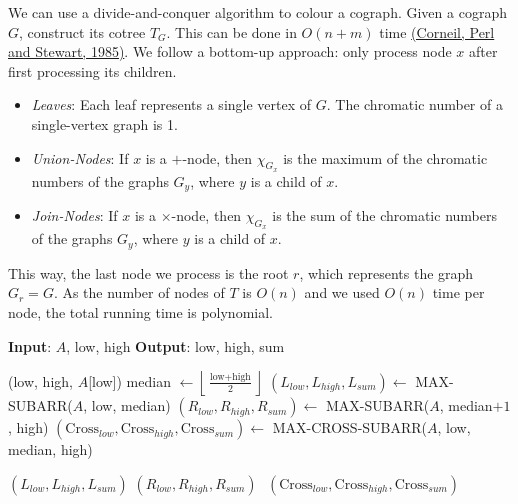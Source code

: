 We can use a divide-and-conquer algorithm to colour a cograph. 
Given a cograph \(G\), construct its cotree \(T_G\). 
This can be done in \(O(n+m)\) time \hyperref[cit:A Linear Recognition Algorithm for Cographs]{(Corneil, Perl and Stewart, 1985)}. 
We follow a bottom-up approach: only process node \(x\) after first processing its children.
\begin{itemize}
    \item \textit{Leaves}: Each leaf represents a single vertex of \(G\).
        The chromatic number of a single-vertex graph is 1.
    \item \textit{Union-Nodes}: If \(x\) is a \(+\)-node, then \(\chi_{G_x}\) is the maximum of the chromatic numbers of the graphs \(G_y\), where \(y\) is a child of \(x\).
    \item \textit{Join-Nodes}: If \(x\) is a \(\times\)-node, then \(\chi_{G_x}\) is the sum of the chromatic numbers of the graphs \(G_y\), where \(y\) is a child of \(x\).
\end{itemize}
This way, the last node we process is the root \(r\), which represents the graph \(G_r=G\).
As the number of nodes of \(T\) is \(O(n)\) and we used \(O(n)\) time per node, the total running time is polynomial.

\begin{algorithm}[H]
    \caption{MAX-SUBARR}
    \begin{algorithmic}
        \State \textbf{Input}: \(A\), low, high
        \State \textbf{Output}: low, high, sum
        
            \Return (low, high, \(A\)[low])
        \Else
            \State median \(\gets \left\lfloor \frac{\text{low} + \text{high}}{2} \right\rfloor\)
            \State \((L_{low}, L_{high}, L_{sum}) \gets\) MAX-SUBARR(\(A\), low, median) 
            \State \((R_{low}, R_{high}, R_{sum}) \gets\) MAX-SUBARR(\(A\), median\(+1\), high) 
            \State \((\text{Cross}_{low}, \text{Cross}_{high}, \text{Cross}_{sum}) \gets\) MAX-CROSS-SUBARR(\(A\), low, median, high) 

                \Return \((L_{low}, L_{high}, L_{sum})\)
            \EndIf
                \Return \((R_{low}, R_{high}, R_{sum})\)
            \Else \( \) \Return \((\text{Cross}_{low}, \text{Cross}_{high}, \text{Cross}_{sum})\)
            \EndIf
        \EndIf
    \end{algorithmic}
    \label{alg:maxsumarr}
\end{algorithm}

